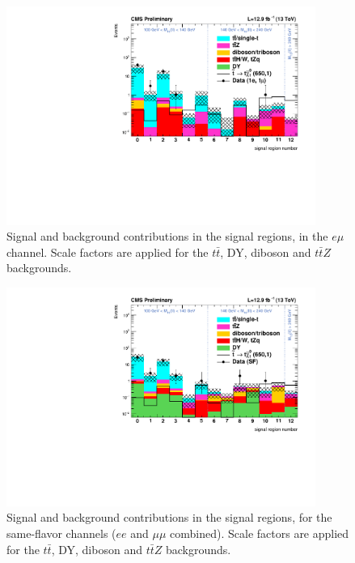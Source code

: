   \begin{figure}
    \centering
    \includegraphics[width=0.9\textwidth]{figures/regions80X/DY-DD/TTZ-DD-Top16009/TTJets-DD/multiBoson-DD/EMu_bkgs.pdf}
    \caption{Signal and background contributions in the signal regions, in the $e\mu$ channel. Scale factors are applied for the $t\bar{t}$, DY, diboson and $t\bar{t}Z$ backgrounds.}
    \label{fig:signalRegions-emu}
  \end{figure}

  \begin{figure}
    \centering
    \includegraphics[width=0.9\textwidth]{figures/regions80X/DY-DD/TTZ-DD-Top16009/TTJets-DD/multiBoson-DD/SF_bkgs.pdf}
    \caption{Signal and background contributions in the signal regions, for the same-flavor channels ($ee$ and $\mu\mu$ combined). Scale factors are applied for the $t\bar{t}$, DY, diboson and $t\bar{t}Z$ backgrounds.}
    \label{fig:signalRegions-sf}
  \end{figure} 

